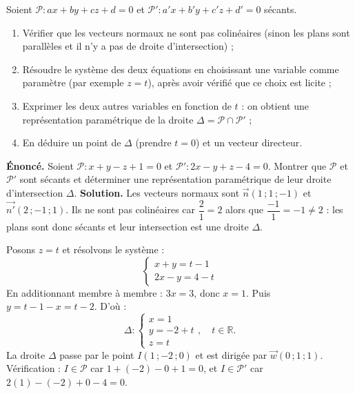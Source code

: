 \documentclass[11pt]{article}
\begin{document}
\begin{methode}
Soient $\mathcal{P} : ax + by + cz + d = 0$ et $\mathcal{P}' : a'x + b'y + c'z + d' = 0$ sécants.
\begin{enumerate}
\item Vérifier que les vecteurs normaux ne sont pas colinéaires (sinon les plans sont parallèles et il n'y a pas de droite d'intersection) ;
\item Résoudre le système des deux équations en choisissant une variable comme paramètre (par exemple $z = t$), après avoir vérifié que ce choix est licite ;
\item Exprimer les deux autres variables en fonction de $t$ : on obtient une représentation paramétrique de la droite $\Delta = \mathcal{P} \cap \mathcal{P}'$ ;
\item En déduire un point de $\Delta$ (prendre $t = 0$) et un vecteur directeur.
\end{enumerate}
\end{methode}

\begin{exoresolu}
\textbf{Énoncé.} Soient $\mathcal{P} : x + y - z + 1 = 0$ et $\mathcal{P}' : 2x - y + z - 4 = 0$. Montrer que $\mathcal{P}$ et $\mathcal{P}'$ sont sécants et déterminer une représentation paramétrique de leur droite d'intersection $\Delta$.
\tcblower
\textbf{Solution.} Les vecteurs normaux sont $\vec{n}(1\,;1\,;-1)$ et $\vec{n'}(2\,;-1\,;1)$. Ils ne sont pas colinéaires car $\dfrac{2}{1} = 2$ alors que $\dfrac{-1}{1} = -1 \neq 2$ : les plans sont donc sécants et leur intersection est une droite $\Delta$.

Posons $z = t$ et résolvons le système :
\[
\begin{cases} x + y = t - 1 \\ 2x - y = 4 - t \end{cases}
\]
En additionnant membre à membre : $3x = 3$, donc $x = 1$. Puis $y = t - 1 - x = t - 2$. D'où :
\[
\Delta : \begin{cases} x = 1 \\ y = -2 + t \\ z = t \end{cases}, \quad t \in \mathbb{R}.
\]
La droite $\Delta$ passe par le point $I(1\,;-2\,;0)$ et est dirigée par $\vec{w}(0\,;1\,;1)$. Vérification : $I \in \mathcal{P}$ car $1 + (-2) - 0 + 1 = 0$, et $I \in \mathcal{P}'$ car $2(1) - (-2) + 0 - 4 = 0$.
\end{exoresolu}
\end{document}
